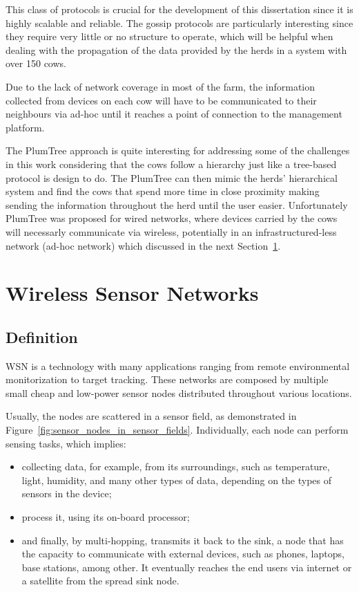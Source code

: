 This class of protocols is crucial for the development of this dissertation since it is highly
scalable and reliable. The gossip protocols are particularly interesting since they require
very little or no structure to operate, which will be helpful when dealing with the
propagation of the data provided by the herds in a system with over 150 cows.

Due to the lack of network coverage in most of the farm, the information collected from
devices on each cow will have to be communicated to their neighbours via ad-hoc until it
reaches a point of connection to the management platform.

The PlumTree approach is quite interesting for addressing some of the challenges in this work
considering that the cows follow a hierarchy just like a tree-based protocol is design to do.
The PlumTree can then mimic the herds' hierarchical system and find the cows that spend more
time in close proximity making sending the information throughout the herd until the user
easier. Unfortunately PlumTree was proposed for wired networks, where devices carried
by the cows will necessarly communicate via wireless, potentially in an infrastructured-less
network (ad-hoc network) which discussed in the next Section~\ref{sec:wireless_sensor_networks}.


\section{Wireless Sensor Networks}
\label{sec:wireless_sensor_networks}

\subsection{Definition}
\label{subsec:wsn_definition}
\Gls{WSN} is a technology with many applications ranging from remote environmental monitorization
to target tracking. These networks are composed by multiple small cheap and low-power sensor
nodes distributed throughout various locations.

Usually, the nodes are scattered in a sensor field, as demonstrated in Figure~\ref{fig:sensor_nodes_in_sensor_fields}.
Individually, each node can perform sensing tasks, which implies:
\begin{itemize}
      \item collecting data, for example, from its surroundings, such as temperature, light,
            humidity, and many other types of data, depending on the types of sensors in the
            device;
      \item process it, using its on-board processor;
      \item and finally, by multi-hopping, transmits it back to the sink, a node that has
            the capacity to communicate with external devices, such as phones, laptops, base
            stations, among other. It eventually reaches the end users via internet or a
            satellite from the spread sink node\cite{Akyildiz2002}. %
\end{itemize}


